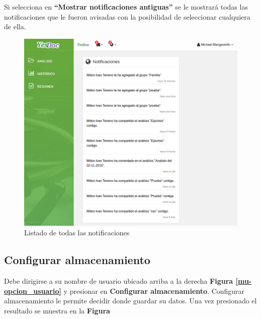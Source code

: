 Si selecciona en \textbf{``Mostrar notificaciones antiguas''} se le mostrará todas las notificaciones que le fueron avisadas con la posibilidad de seleccionar cualquiera de ella.

\begin{figure}
	\centering
	\includegraphics[width=.8\textwidth]{img/manual_de_usuario/lista_notificaciones}
	\caption{Listado de todas las notificaciones}
	\label{mu-lista_notificaciones}
\end{figure}

\subsection{Configurar almacenamiento}
Debe dirigirse a su nombre de usuario ubicado arriba a la derecha \textbf{Figura \ref{mu-opcion_usuario}} y presionar en \textbf{Configurar almacenamiento}. Configurar almacenamiento le permite decidir donde guardar su datos. Una vez presionado el resultado se muestra en la \textbf{Figura}


